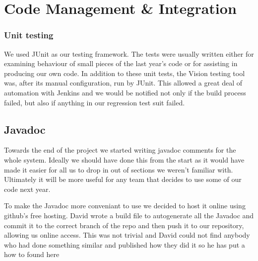 \section{Code Management \& Integration}

\subsubsection{Unit testing}
We used JUnit as our testing framework. The tests were usually written either for examining behaviour of small pieces of the last year's code or for assisting in producing our own code. In addition to these unit tests, the Vision testing tool was, after its manual configuration, run by JUnit. This allowed a great deal of automation with Jenkins and we would be notified not only if the build process failed, but also if anything in our regression test suit failed.

\subsection{Javadoc}
Towards the end of the project we started writing javadoc comments for the whole system.  Ideally we should have done this from the start as it would have made it easier for all us to drop in out of sections we weren't familiar with.  Ultimately it will be more useful for any team that decides to use some of our code next year. 

To make the Javadoc more conveniant to use we decided to host it online using github's free hosting.  David wrote a build file to autogenerate all the Javadoc and commit it to the correct branch of the repo and then push it to our repository, allowing us online access.  This was not trivial and David could not find anybody who had done something similar and published how they did it so he has put a how to found here \cite{javadoc}
